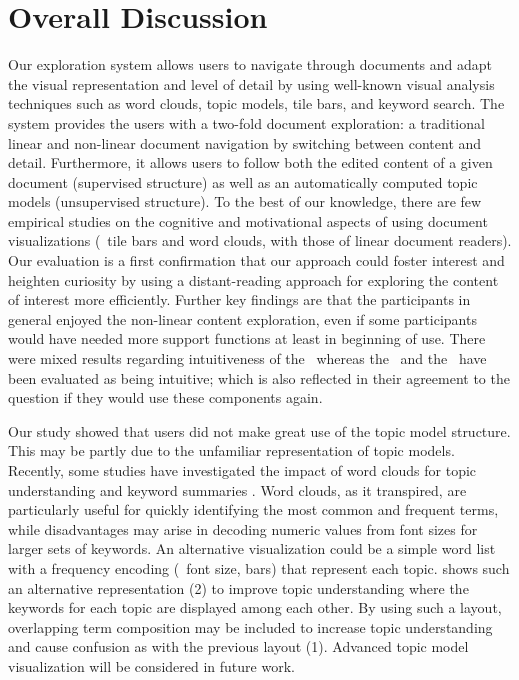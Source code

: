 \section{Overall Discussion} \label{sec:discussion} 

Our exploration system allows users to navigate through documents and adapt the visual representation and level of detail by using well-known visual analysis techniques such as word clouds, topic models, tile bars, and keyword search. 
%
The system provides the users with a two-fold document exploration: a traditional linear and non-linear document navigation by switching between content and detail. 
%
Furthermore, it allows users to follow both the edited content of a given document (supervised structure) as well as an automatically computed topic models (unsupervised structure). 
%
To the best of our knowledge, there are few empirical studies on the cognitive and motivational aspects of using document visualizations (\eg\ tile bars and word clouds, with those of linear document readers). 
%
Our evaluation is a first confirmation that our approach could foster interest and heighten curiosity by using a distant-reading approach for exploring the content of interest more efficiently.
%
Further key findings are that the participants in general enjoyed the non-linear content exploration, even if some participants would have needed more support functions at least in beginning of use. 
%
There were mixed results regarding intuitiveness of the \WordCloud\, whereas the \Tilebar\ and the \ImageSlider\ have been evaluated as being intuitive; which is also reflected in their agreement to the question if they would use these components again.



Our study showed that users did not make great use of the topic model structure. 
%
This may be partly due to the unfamiliar representation of topic models. 
%
Recently, some studies have investigated the impact of word clouds for topic understanding \cite{10.1162/tacl_a_00042} and keyword summaries \cite{8017641}. 
%
Word clouds, as it transpired, are particularly useful for quickly identifying the most common and frequent terms, while disadvantages may arise in decoding numeric values from font sizes for larger sets of keywords. 
%
An alternative visualization could be a simple word list with a frequency encoding (\eg\ font size, bars) that represent each topic. 
%
 shows such an alternative representation (2) to improve topic understanding where the keywords for each topic are displayed among each other. 
%
By using such a layout, overlapping term composition may be included to increase topic understanding and cause confusion as with the previous layout (1). 
%
Advanced topic model visualization will be considered in future work.

